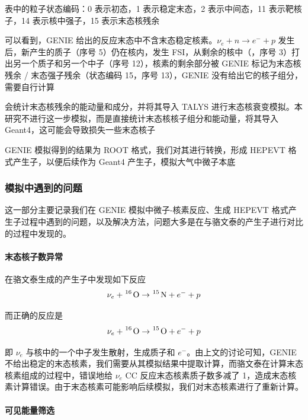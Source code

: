 \documentclass[12pt]{article}
\begin{document}
表中的粒子状态编码：0 表示初态，1 表示稳定末态，2 表示中间态，11 表示靶核子，14 表示核中强子，15 表示末态核残余

可以看到，GENIE 给出的反应末态中不含末态稳定核素。$\nu_e + n \to e^- + p$ 发生后，新产生的质子（序号 5）仍在核内，发生 FSI，从剩余的核中（，序号 3）打出另一个质子和另一个中子（序号 12），核素的剩余部分被 GENIE 标记为末态核残余 / 末态强子残余（状态编码 15，序号 13），GENIE 没有给出它的核子组分，需要自行计算

\cite{cheng_neutral-current_2025} 会统计末态核残余的能动量和成分，并将其导入 TALYS 进行末态核衰变模拟。本研究不进行这一步模拟，而是直接统计末态核核子组分和能动量，将其导入 Geant4，这可能会导致损失一些末态核子

GENIE 模拟得到的结果为 ROOT 格式，我们对其进行转换，形成 HEPEVT 格式产生子，以便后续作为 Geant4 产生子，模拟大气中微子本底

\subsubsection{模拟中遇到的问题}

这一部分主要记录我们在 GENIE 模拟中微子-核素反应、生成 HEPEVT 格式产生子过程中遇到的问题，以及解决方法，问题大多是在与骆文泰的产生子进行对比的过程中发现的。

\paragraph{末态核子数异常}

在骆文泰生成的产生子中发现如下反应
\begin{equation}
    \nu_e + \ce{{}^{16} O} \to \ce{{}^{15} N} + e^- + p
\end{equation}

而正确的反应是
\begin{equation}
    \nu_e + \ce{{}^{16} O} \to \ce{{}^{15} O} + e^- + p
\end{equation}

即 $\nu_e$ 与核中的一个中子发生散射，生成质子和 $e^-$。由上文的讨论可知，GENIE 不给出稳定的末态核素，我们需要从其模拟结果中提取计算，而骆文泰在计算末态核素组成的过程中，错误地给 $\nu_e$ CC 反应末态核素质子数多减了 1，造成末态核素计算错误。由于末态核素可能影响后续模拟，我们对末态核素进行了重新计算。

\paragraph{可见能量筛选}
\end{document}
